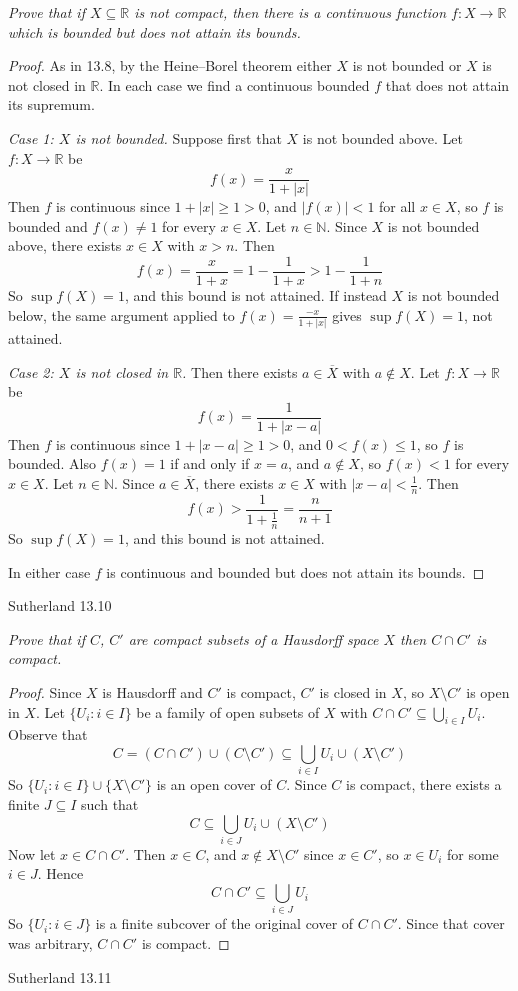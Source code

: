 \documentclass[minion]{homework}
\newcommand{\Reals}{\ensuremath{\mathbb R}}%
\newcommand{\Nats}{\ensuremath{\mathbb N}} %
\begin{document}
\begin{problems}
\textit{Prove that if $X \subseteq \Reals$ is not compact, then there is a continuous function $f \colon X \to \Reals$ which is bounded but does not attain its bounds.}
\newline
\begin{proof}
  As in 13.8, by the Heine--Borel theorem either $X$ is not bounded or $X$ is not closed in $\Reals$. In each case we find a continuous bounded $f$ that does not attain its supremum.

  \emph{Case 1: $X$ is not bounded.} Suppose first that $X$ is not bounded above. Let $f \colon X \to \Reals$ be
  $$f(x) = \frac{x}{1 + |x|}$$
  Then $f$ is continuous since $1 + |x| \geq 1 > 0$, and $|f(x)| < 1$ for all $x \in X$, so $f$ is bounded and $f(x) \neq 1$ for every $x \in X$.
  Let $n \in \Nats$. Since $X$ is not bounded above, there exists $x \in X$ with $x > n$. Then
  $$f(x) = \frac{x}{1 + x} = 1 - \frac{1}{1 + x} > 1 - \frac{1}{1 + n}$$
  So $\sup f(X) = 1$, and this bound is not attained. If instead $X$ is not bounded below, the same argument applied to $f(x) = \frac{-x}{1 + |x|}$ gives $\sup f(X) = 1$, not attained.

  \emph{Case 2: $X$ is not closed in $\Reals$.} Then there exists $a \in \overline{X}$ with $a \notin X$. Let $f \colon X \to \Reals$ be
  $$f(x) = \frac{1}{1 + |x - a|}$$
  Then $f$ is continuous since $1 + |x - a| \geq 1 > 0$, and $0 < f(x) \leq 1$, so $f$ is bounded. Also $f(x) = 1$ if and only if $x = a$, and $a \notin X$, so $f(x) < 1$ for every $x \in X$.
  Let $n \in \Nats$. Since $a \in \overline{X}$, there exists $x \in X$ with $|x - a| < \tfrac{1}{n}$. Then
  $$f(x) > \frac{1}{1 + \frac{1}{n}} = \frac{n}{n + 1}$$
  So $\sup f(X) = 1$, and this bound is not attained.

  In either case $f$ is continuous and bounded but does not attain its bounds.
\end{proof}
\problem Sutherland 13.10

\textit{Prove that if $C$, $C'$ are compact subsets of a Hausdorff space $X$ then $C \cap C'$ is compact.}
\newline
\begin{proof}
  Since $X$ is Hausdorff and $C'$ is compact, $C'$ is closed in $X$, so $X \setminus C'$ is open in $X$.
  Let $\{U_i : i \in I\}$ be a family of open subsets of $X$ with $C \cap C' \subseteq \bigcup_{i \in I} U_i$. Observe that
  $$C = (C \cap C') \cup (C \setminus C') \subseteq \bigcup_{i \in I} U_i \cup (X \setminus C')$$
  So $\{U_i : i \in I\} \cup \{X \setminus C'\}$ is an open cover of $C$. Since $C$ is compact, there exists a finite $J \subseteq I$ such that
  $$C \subseteq \bigcup_{i \in J} U_i \cup (X \setminus C')$$
  Now let $x \in C \cap C'$. Then $x \in C$, and $x \notin X \setminus C'$ since $x \in C'$, so $x \in U_i$ for some $i \in J$. Hence
  $$C \cap C' \subseteq \bigcup_{i \in J} U_i$$
  So $\{U_i : i \in J\}$ is a finite subcover of the original cover of $C \cap C'$. Since that cover was arbitrary, $C \cap C'$ is compact.
\end{proof}
\problem Sutherland 13.11


\end{problems}
\end{document}
